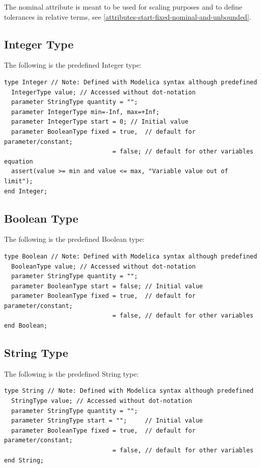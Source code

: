\documentclass[10pt,a4paper]{report}
\def\doublelabel#1{\label{#1}}
\begin{document}
The nominal attribute is meant to be used for scaling purposes and to
define tolerances in relative terms, see \ref{attributes-start-fixed-nominal-and-unbounded}.

\subsection{Integer Type}\doublelabel{integer-type}
The following is the predefined Integer type:
\begin{lstlisting}[language=Modelica]
type Integer // Note: Defined with Modelica syntax although predefined
  IntegerType value; // Accessed without dot-notation
  parameter StringType quantity = "";
  parameter IntegerType min=-Inf, max=+Inf;
  parameter IntegerType start = 0; // Initial value
  parameter BooleanType fixed = true,  // default for parameter/constant;
                              = false; // default for other variables
equation
  assert(value >= min and value <= max, "Variable value out of limit");
end Integer;
\end{lstlisting}

\subsection{Boolean Type}\doublelabel{boolean-type}
The following is the predefined Boolean type:
\begin{lstlisting}[language=Modelica]
type Boolean // Note: Defined with Modelica syntax although predefined
  BooleanType value; // Accessed without dot-notation
  parameter StringType quantity = "";
  parameter BooleanType start = false; // Initial value
  parameter BooleanType fixed = true,  // default for parameter/constant;
                              = false, // default for other variables
end Boolean;
\end{lstlisting}

\subsection{String Type}\doublelabel{string-type}

The following is the predefined String type:
\begin{lstlisting}[language=Modelica]
type String // Note: Defined with Modelica syntax although predefined
  StringType value; // Accessed without dot-notation
  parameter StringType quantity = "";
  parameter StringType start = "";     // Initial value
  parameter BooleanType fixed = true,  // default for parameter/constant;
                              = false, // default for other variables
end String;
\end{lstlisting}
\end{document}
